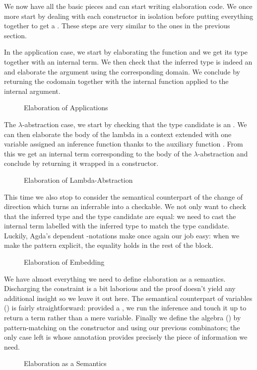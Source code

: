 We now have all the basic pieces and can start writing elaboration code. We
once more start by dealing with each constructor in isolation before putting
everything together to get a . These steps are very similar to
the ones in the previous section.

In the application case, we start by elaborating the function and we get its
type together with an internal term. We then check that the inferred type is
indeed an  and elaborate the argument using the corresponding domain.
We conclude by returning the codomain together with the internal function
applied to the internal argument.

\begin{figure}[h]
\caption{Elaboration of Applications}
\end{figure}

The $\lambda$-abstraction case, we start by checking that the type candidate
is an . We can then elaborate the body of the lambda in a context
extended with one  variable assigned an inference function thanks
to the auxiliary function . From this we get an internal term corresponding
to the body of the $\lambda$-abstraction and conclude by returning it wrapped
in a  constructor.

\begin{figure}[h]
\caption{Elaboration of Lambda-Abstraction}
\end{figure}

This time we also stop to consider the semantical counterpart of the change of
direction  which turns an inferrable into a checkable. We not only want
to check that the inferred type and the type candidate are equal: we need to cast
the internal term labelled with the inferred type to match the type candidate.
Luckily, Agda's dependent -notations make once again our job easy: when
we make the pattern  explicit, the equality holds in the rest of the block.

\begin{figure}[h]
\caption{Elaboration of Embedding}
\end{figure}

We have almost everything we need to define elaboration as a semantics. Discharging
the  constraint is a bit laborious and the proof doesn't
yield any additional insight so we leave it out here. The semantical counterpart of
variables () is fairly straightforward: provided a , we run the
inference and touch it up to return a term rather than a mere variable. Finally we
define the algebra () by pattern-matching on the constructor and using our
previous combinators; the only case left is  whose  annotation
provides precisely the piece of information we need.

\begin{figure}[h]
\caption{Elaboration as a Semantics}
\end{figure}
